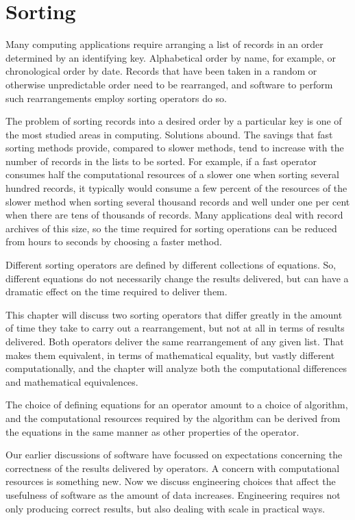 \chapter{Sorting}
\label{ch:sorting}

Many computing applications require arranging a list of records
in an order determined by an identifying key.
Alphabetical order by name, for example, or chronological order by date.
Records that have been taken in a random or otherwise unpredictable order
need to be rearranged, and software to perform such rearrangements
employ sorting operators do so.

The problem of sorting records into a desired order by a particular key
is one of the most studied areas in computing.
Solutions abound.
The savings that fast sorting methods provide,
compared to slower methods, tend to
increase with the number of records in the lists to be sorted.
For example, if a fast operator consumes half the computational resources
of a slower one when sorting several hundred records,
it typically would consume a few percent of the resources
of the slower method when sorting several thousand records
and well under one per cent when there are tens of thousands of records.
Many applications deal with record archives of this size,
so the time required for sorting operations can be reduced
from hours to seconds by choosing a faster method.

Different sorting operators are defined
by different collections of equations.
So, different equations do not necessarily change the
results delivered, but can have a dramatic effect on
the time required to deliver them.

This chapter will discuss two sorting operators that differ
greatly in the amount of time they take to carry out a rearrangement,
but not at all in terms of results delivered.
Both operators deliver the same rearrangement of any given list.
That makes them equivalent, in terms of mathematical equality,
but vastly different computationally, and the chapter
will analyze both the computational differences
and mathematical equivalences.

The choice of defining equations for an operator
amount to a choice of algorithm, and the computational
resources required by the algorithm can be derived
from the equations in the same manner as other properties
of the operator.

Our earlier discussions of software have focussed on
expectations concerning
the correctness of the results delivered by operators.
A concern with computational resources is something new.
Now we discuss engineering choices that affect the usefulness of
software as the amount of data increases.
Engineering requires not only producing correct
results, but also dealing with scale in practical ways.

